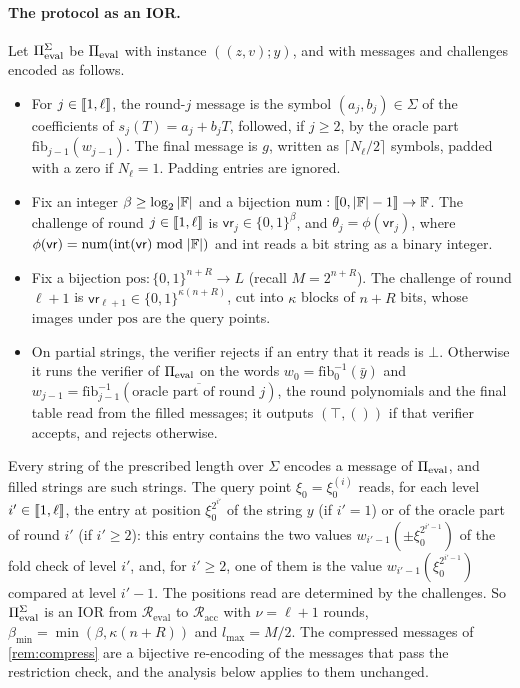 \paragraph{The protocol as an IOR.}
Let $\Pi_{\mathrm{eval}}^{\Sigma}$ be $\Pi_{\mathrm{eval}}$ with instance $((z,v); y)$, and with messages and challenges encoded as follows.
\begin{itemize}
  \item For $j \in \llbracket 1, \ell \rrbracket$, the round-$j$ message is the symbol $(a_j, b_j) \in \Sigma$ of the coefficients of $s_j(T) = a_j + b_j T$, followed, if $j \ge 2$, by the oracle part $\mathrm{fib}_{j-1}(w_{j-1})$. The final message is $g$, written as $\lceil N_\ell/2 \rceil$ symbols, padded with a zero if $N_\ell = 1$. Padding entries are ignored.
  \item Fix an integer $\beta \ge \log_2 |\mathbb{F}|$ and a bijection $\mathrm{num} : \llbracket 0, |\mathbb{F}|-1 \rrbracket \to \mathbb{F}$. The challenge of round $j \in \llbracket 1, \ell \rrbracket$ is $\mathsf{vr}_j \in \{0,1\}^\beta$, and $\theta_j = \phi(\mathsf{vr}_j)$, where $\phi(\mathsf{vr}) = \mathrm{num}(\mathrm{int}(\mathsf{vr}) \bmod |\mathbb{F}|)$ and $\mathrm{int}$ reads a bit string as a binary integer.
  \item Fix a bijection $\mathrm{pos} : \{0,1\}^{n+R} \to L$ (recall $M = 2^{n+R}$). The challenge of round $\ell+1$ is $\mathsf{vr}_{\ell+1} \in \{0,1\}^{\kappa(n+R)}$, cut into $\kappa$ blocks of $n+R$ bits, whose images under $\mathrm{pos}$ are the query points.
  \item On partial strings, the verifier rejects if an entry that it reads is $\bot$. Otherwise it runs the verifier of $\Pi_{\mathrm{eval}}$ on the words $w_0 = \mathrm{fib}_0^{-1}(\bar y)$ and $w_{j-1} = \mathrm{fib}_{j-1}^{-1}(\overline{\text{oracle part of round } j})$, the round polynomials and the final table read from the filled messages; it outputs $(\top, ())$ if that verifier accepts, and rejects otherwise.
\end{itemize}
Every string of the prescribed length over $\Sigma$ encodes a message of $\Pi_{\mathrm{eval}}$, and filled strings are such strings.
The query point $\xi_0 = \xi^{(i)}_0$ reads, for each level $i' \in \llbracket 1, \ell \rrbracket$, the entry at position $\xi_0^{2^{i'}}$ of the string $y$ (if $i' = 1$) or of the oracle part of round $i'$ (if $i' \ge 2$): this entry contains the two values $w_{i'-1}(\pm\xi_0^{2^{i'-1}})$ of the fold check of level $i'$, and, for $i' \ge 2$, one of them is the value $w_{i'-1}(\xi_0^{2^{i'-1}})$ compared at level $i'-1$.
The positions read are determined by the challenges.
So $\Pi_{\mathrm{eval}}^{\Sigma}$ is an IOR from $\mathcal{R}_{\mathrm{eval}}$ to $\mathcal{R}_{\mathrm{acc}}$ with $\nu = \ell + 1$ rounds, $\beta_{\min} = \min(\beta, \kappa(n+R))$ and $l_{\max} = M/2$.
The compressed messages of \cref{rem:compress} are a bijective re-encoding of the messages that pass the restriction check, and the analysis below applies to them unchanged.

